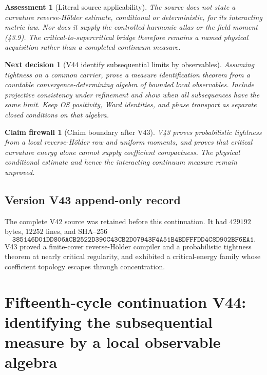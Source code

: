 \documentclass[11pt]{article}
\newtheorem{firewall}[theorem]{Claim firewall}
\newtheorem{decision}[theorem]{Next decision}
\newtheorem{assessment}[theorem]{Assessment}
\theoremstyle{remark}
\begin{document}
\begin{assessment}[Literal source applicability]
\label{ass:v15v43-source}
The source does not state a curvature reverse-Hölder estimate,
conditional or deterministic, for its interacting metric law.
Nor does it supply the controlled harmonic atlas or the field
moment (43.9).  The critical-to-supercritical bridge therefore
remains a named physical acquisition rather than a completed
continuum measure.
\end{assessment}

\begin{decision}[V44 identify subsequential limits by observables]
\label{dec:v15v43-next}
Assuming tightness on a common carrier, prove a measure
identification theorem from a countable convergence-determining
algebra of bounded local observables.  Include projective
consistency under refinement and show when all subsequences have the
same limit.  Keep OS positivity, Ward identities, and phase
transport as separate closed conditions on that algebra.
\end{decision}

\begin{firewall}[Claim boundary after V43]
\label{fire:v15v43}
V43 proves probabilistic tightness from a local reverse-Hölder row
and uniform moments, and proves that critical curvature energy alone
cannot supply coefficient compactness.  The physical conditional
estimate and hence the interacting continuum measure remain
unproved.
\end{firewall}

\section*{Version V43 append-only record}
The complete V42 source was retained before this continuation.  It
had \(429192\) bytes, \(12252\) lines, and SHA--256
\[
 \texttt{385146D01DD806ACB2522D390C43CB2D07943F4A51B4BDFFFDD4C8D902BF6EA1}.
\]
V43 proved a finite-cover reverse-Hölder compiler and a
probabilistic tightness theorem at nearly critical regularity, and
exhibited a critical-energy family whose coefficient topology
escapes through concentration.

\chapter{Fifteenth-cycle continuation V44: identifying the subsequential measure by a local observable algebra}
\label{sec:v15v44}
\end{document}
